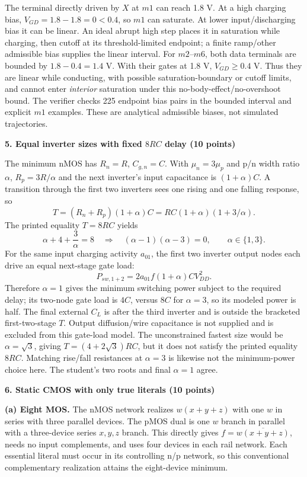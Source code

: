 \documentclass[10pt]{article}
\newcommand{\qheading}[1]{\par\medskip\textbf{#1}\par}
\begin{document}
The terminal directly driven by $X$ at $m1$ can reach 1.8 V. At a high charging bias, $V_{GD}=1.8-1.8=0<0.4$, so $m1$ can saturate. At lower input/discharging bias it can be linear. An ideal abrupt high step places it in saturation while charging, then cutoff at its threshold-limited endpoint; a finite ramp/other admissible bias supplies the linear interval.
For $m2$--$m6$, both data terminals are bounded by $1.8-0.4=1.4$ V. With their gates at 1.8 V, $V_{GD}\ge0.4$ V. Thus they are linear while conducting, with possible saturation-boundary or cutoff limits, and cannot enter \emph{interior} saturation under this no-body-effect/no-overshoot bound. The verifier checks 225 endpoint bias pairs in the bounded interval and explicit $m1$ examples. These are analytical admissible biases, not simulated trajectories.
\newpage
\qheading{5. Equal inverter sizes with fixed $8RC$ delay (10 points)}
The minimum nMOS has $R_n=R$, $C_{g,n}=C$. With $\mu_n=3\mu_p$ and p/n width ratio $\alpha$, $R_p=3R/\alpha$ and the next inverter's input capacitance is $(1+\alpha)C$. A transition through the first two inverters sees one rising and one falling response, so
\[T=(R_n+R_p)(1+\alpha)C=RC(1+\alpha)(1+3/\alpha).\]
The printed equality $T=8RC$ yields
\[\alpha+4+\frac3\alpha=8\quad\Longrightarrow\quad(\alpha-1)(\alpha-3)=0,
\qquad \alpha\in\{1,3\}.\]
For the same input charging activity $a_{01}$, the first two inverter output nodes each drive an equal next-stage gate load:
\[P_{sw,1+2}=2a_{01}f(1+\alpha)CV_{DD}^2.\]
Therefore $\boxed{\alpha=1}$ gives the minimum switching power subject to the required delay; its two-node gate load is $4C$, versus $8C$ for $\alpha=3$, so its modeled power is half. The final external $C_L$ is after the third inverter and is outside the bracketed first-two-stage $T$. Output diffusion/wire capacitance is not supplied and is excluded from this gate-load model.
The unconstrained fastest size would be $\alpha=\sqrt3$, giving $T=(4+2\sqrt3)RC$, but it does not satisfy the printed equality $8RC$. Matching rise/fall resistances at $\alpha=3$ is likewise not the minimum-power choice here. The student's two roots and final $\alpha=1$ agree.
\qheading{6. Static CMOS with only true literals (10 points)}
\textbf{(a) Eight MOS.} The nMOS network realizes $w(x+y+z)$ with one $w$ in series with three parallel devices. The pMOS dual is one $w$ branch in parallel with a three-device series $x,y,z$ branch. This directly gives $f=\overline{w(x+y+z)}$, needs no input complements, and uses four devices in each rail network. Each essential literal must occur in its controlling n/p network, so this conventional complementary realization attains the eight-device minimum.
\end{document}
